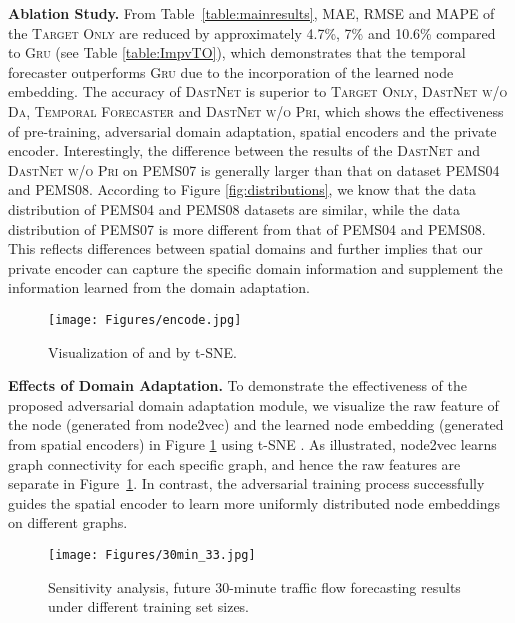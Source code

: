 \documentclass[sigconf]{acmart}
\theoremstyle{definition}
\begin{document}
\noindent\textbf{Ablation Study.}
From Table~\ref{table:mainresults}, MAE, RMSE and MAPE of the \textsc{Target Only} are reduced by approximately 4.7\%, 7\% and 10.6\% compared to \textsc{Gru} (see Table \ref{table:ImpvTO}), which demonstrates that the temporal forecaster outperforms \textsc{Gru} due to the incorporation of the learned node embedding. The accuracy of \textsc{DastNet} is superior to \textsc{Target Only}, \textsc{DastNet w/o Da}, \textsc{Temporal Forecaster} and \textsc{DastNet w/o Pri}, which shows the effectiveness of pre-training, adversarial domain adaptation, spatial encoders and the private encoder. 
Interestingly, the difference between the results of the \textsc{DastNet} and \textsc{DastNet w/o Pri} on PEMS07 is generally larger than that on dataset PEMS04 and PEMS08. According to Figure \ref{fig:distributions}, we know that the data distribution of PEMS04 and PEMS08 datasets are similar, while the data distribution of PEMS07 is more different from that of PEMS04 and PEMS08. This reflects differences between spatial domains and further implies that our private encoder can capture the specific domain information and supplement the information learned from the domain adaptation. 



\begin{figure}[h]
    \centering
    \texttt{[image: Figures/encode.jpg]}
    \caption{Visualization of  and  by t-SNE.}
    \label{fig:encode}
\end{figure}

\noindent\textbf{Effects of Domain Adaptation.}
To demonstrate the effectiveness of the proposed adversarial domain adaptation module, we visualize the raw feature of the node  (generated from node2vec) and the learned node embedding  (generated from spatial encoders) in Figure \ref{fig:encode} using t-SNE \cite{van2013barnes}. As illustrated, node2vec learns graph connectivity for each specific graph, and hence the raw features are separate in Figure~\ref{fig:encode}. In contrast, the adversarial training process successfully guides the spatial encoder to learn more uniformly distributed node embeddings on different graphs.






\begin{figure}[h]
    \centering
    \texttt{[image: Figures/30min\_33.jpg]}
    \caption{Sensitivity analysis, future 30-minute traffic flow forecasting results under different training set sizes.}\label{fig:sensitivity_MAE}
\end{figure}
\end{document}
